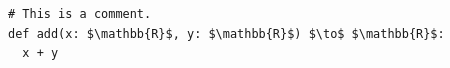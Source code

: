 \documentclass[border=10pt]{standalone}
\begin{document}
\begin{lstlisting}
# This is a comment.
def add(x: $\mathbb{R}$, y: $\mathbb{R}$) $\to$ $\mathbb{R}$:
  x + y
\end{lstlisting}
\end{document}
